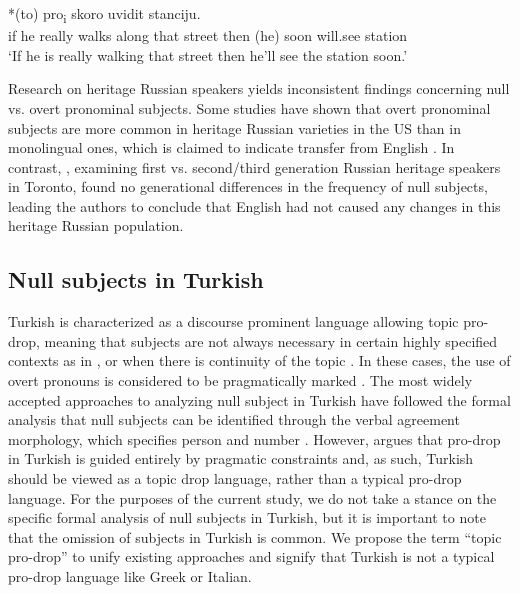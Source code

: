 \documentclass[output=paper,colorlinks,citecolor=brown]{langscibook}
\begin{document}
\ea \label{ex:oezsoy:optionaldropRU}
 *(to) pro\textsubscript{i} skoro uvidit stanciju.\\ 
	\hphantom{[}if he really walks along that street then (he) soon will.see station\\
\glt `If he is really walking that street then he’ll see the station soon.'
\z
{}

Research on heritage Russian speakers yields inconsistent findings concerning null vs. overt pronominal subjects. Some studies have shown that overt pronominal subjects are more common in heritage Russian varieties in the US than in monolingual ones, which is claimed to indicate transfer from English \parencite{isurin2011russian, DubininaPolinsky2013, Ivanova-Sullivan2014}. In contrast, \textcite{nagy2011null}, examining first vs. second/third generation Russian heritage speakers in Toronto, found no generational differences in the frequency of null subjects, leading the authors to conclude that English had not caused any changes in this heritage Russian population.

\subsection{Null subjects in Turkish}
Turkish is characterized as a discourse prominent language allowing topic pro-drop, meaning that subjects are not always necessary in certain highly specified contexts as in , or when there is continuity of the topic \parencite{taylan_Turkish_2001, Oeztuerk2008}. In these cases, the use of overt pronouns is considered to be pragmatically marked \parencite{enc1986topic}. The most widely accepted approaches to analyzing null subject in Turkish have followed the formal analysis that null subjects can be identified through the verbal agreement morphology, which specifies person and number \parencite{enc1986topic}. However, \textcite{taylan_Turkish_2001} argues that pro-drop in Turkish is guided entirely by pragmatic constraints and, as such, Turkish should be viewed as a topic drop language, rather than a typical pro-drop language. For the purposes of the current study, we do not take a stance on the specific formal analysis of null subjects in Turkish, but it is important to note that the omission of subjects in Turkish is common. We propose the term ``topic pro-drop'' to unify existing approaches and signify that Turkish is not a typical pro-drop language like Greek or Italian.
\end{document}
